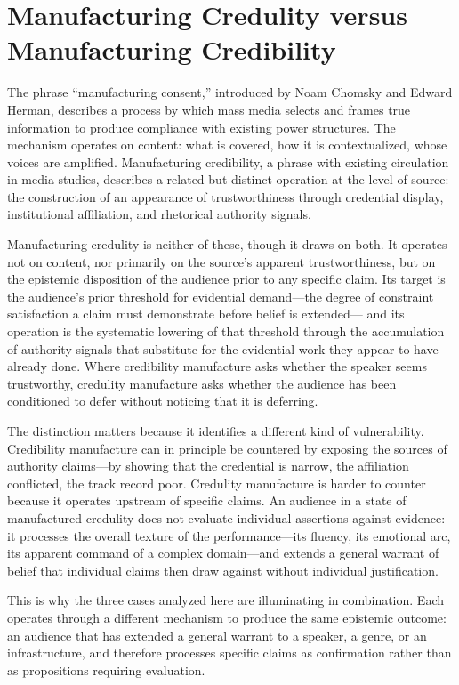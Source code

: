 \documentclass[12pt, a4paper]{article}
\begin{document}
\section{Manufacturing Credulity versus Manufacturing Credibility}

The phrase ``manufacturing consent,'' introduced by Noam Chomsky and Edward Herman, describes a
process by which mass media selects and frames true information to produce compliance with existing
power structures. The mechanism operates on content: what is covered, how it is contextualized,
whose voices are amplified. Manufacturing credibility, a phrase with existing circulation in media
studies, describes a related but distinct operation at the level of source: the construction of an
appearance of trustworthiness through credential display, institutional affiliation, and rhetorical
authority signals.

Manufacturing credulity is neither of these, though it draws on both. It operates not on content,
nor primarily on the source's apparent trustworthiness, but on the epistemic disposition of the
audience prior to any specific claim. Its target is the audience's prior threshold for evidential
demand---the degree of constraint satisfaction a claim must demonstrate before belief is extended---
and its operation is the systematic lowering of that threshold through the accumulation of authority
signals that substitute for the evidential work they appear to have already done. Where credibility
manufacture asks whether the speaker seems trustworthy, credulity manufacture asks whether the
audience has been conditioned to defer without noticing that it is deferring.

The distinction matters because it identifies a different kind of vulnerability. Credibility
manufacture can in principle be countered by exposing the sources of authority claims---by showing
that the credential is narrow, the affiliation conflicted, the track record poor. Credulity
manufacture is harder to counter because it operates upstream of specific claims. An audience in a
state of manufactured credulity does not evaluate individual assertions against evidence: it
processes the overall texture of the performance---its fluency, its emotional arc, its apparent
command of a complex domain---and extends a general warrant of belief that individual claims then
draw against without individual justification.

This is why the three cases analyzed here are illuminating in combination. Each operates through a
different mechanism to produce the same epistemic outcome: an audience that has extended a general
warrant to a speaker, a genre, or an infrastructure, and therefore processes specific claims as
confirmation rather than as propositions requiring evaluation.
\end{document}
